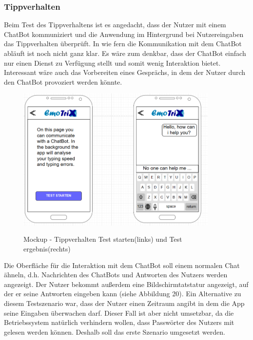 \subsubsection{Tippverhalten}
Beim Test des Tippverhaltens ist es angedacht, dass der Nutzer mit einem ChatBot kommuniziert und die Anwendung im Hintergrund bei Nutzereingaben das Tippverhalten überprüft. In wie fern die Kommunikation mit dem ChatBot abläuft ist noch nicht ganz klar. Es wäre zum denkbar, dass der ChatBot einfach nur einen Dienst zu Verfügung stellt und somit wenig Interaktion bietet. Interessant wäre auch das Vorbereiten eines Gesprächs, in dem der Nutzer durch den ChatBot provoziert werden könnte.
\begin{figure}[h]
	\centering
	\includegraphics[width=10cm]{Bilder/Mockup-Tippverhalten.png}
	\label{img:Mockup-Tippverhalten}
	\caption[Mockup - Tippverhalten Test starten(links) und Test ergebnis(rechts)]{Mockup - Tippverhalten Test starten(links) und Test ergebnis(rechts)}
\end{figure}%
Die Oberfläche für die Interaktion mit dem ChatBot soll einem normalen Chat ähneln, d.h. Nachrichten des ChatBots und Antworten des Nutzers werden angezeigt. Der Nutzer bekommt außerdem eine Bildschirmtatstatur angezeigt, auf der er seine Antworten eingeben kann (siehe Abbildung 20).\newline
Ein Alternative zu diesem Testszenario war, dass der Nutzer einen Zeitraum angibt in dem die App seine Eingaben überwachen darf. Dieser Fall ist aber nicht umsetzbar, da die Betriebssystem natürlich verhindern wollen, dass Passwörter des Nutzers mit gelesen werden können.
Deshalb soll das erste Szenario umgesetzt werden.
